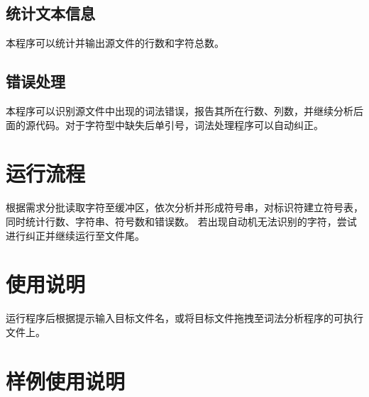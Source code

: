 \documentclass[UTF8]{ctexart}
\begin{document}
\subsection{统计文本信息}
本程序可以统计并输出源文件的行数和字符总数。
\subsection{错误处理}
本程序可以识别源文件中出现的词法错误，报告其所在行数、列数，并继续分析后面的源代码。对于字符型中缺失后单引号，词法处理程序可以自动纠正。
\section{运行流程}
根据需求分批读取字符至缓冲区，依次分析并形成符号串，对标识符建立符号表，同时统计行数、字符串、符号数和错误数。
若出现自动机无法识别的字符，尝试进行纠正并继续运行至文件尾。
\section{使用说明}
运行程序后根据提示输入目标文件名，或将目标文件拖拽至词法分析程序的可执行文件上。
\section{样例使用说明}
\end{document}
